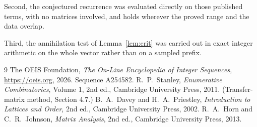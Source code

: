 \documentclass[11pt,a4paper]{article}
\theoremstyle{plain}
\theoremstyle{definition}
\begin{document}
Second, the conjectured recurrence was evaluated directly on those published terms, with no
matrices involved, and holds wherever the proved range and the data overlap.

Third, the annihilation test of Lemma~\ref{lem:crit} was carried out in exact integer
arithmetic on the whole vector rather than on a sampled prefix.

\begin{thebibliography}{9}
 The OEIS Foundation, \emph{The On-Line Encyclopedia of Integer
Sequences}, \url{https://oeis.org}, 2026. Sequence A254582.
 R.~P.~Stanley, \emph{Enumerative Combinatorics}, Volume 1, 2nd ed.,
Cambridge University Press, 2011. (Transfer-matrix method, Section 4.7.)
 B.~A.~Davey and H.~A.~Priestley, \emph{Introduction to Lattices and
Order}, 2nd ed., Cambridge University Press, 2002.
 R.~A.~Horn and C.~R.~Johnson, \emph{Matrix Analysis}, 2nd ed., Cambridge
University Press, 2013.
\end{thebibliography}
\end{document}
